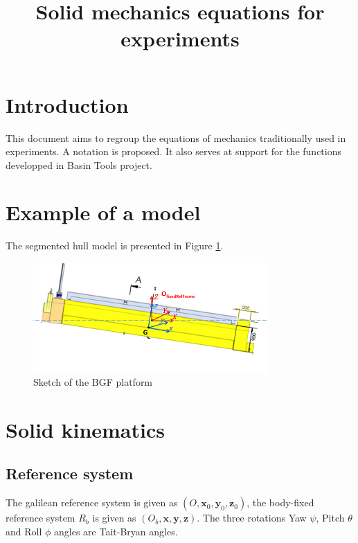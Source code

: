 \documentclass{article}
\title {Solid mechanics equations for experiments}
\begin{document}
\maketitle
\begin{versionhistory}
\end{versionhistory}

\section{Introduction}
This document aims to regroup the equations of mechanics traditionally used in experiments.  A notation is proposed. It also serves at support for the functions developped in Basin Tools project. 

\section{Example of a model}

The segmented hull model is presented in Figure \ref{figSegmentedHullModel}. 

\begin{figure}[htbp]
\centering
\includegraphics[width=0.8\textwidth]{BGF}
\caption{Sketch of the BGF platform}
\label{figSegmentedHullModel}
\end{figure}




\section{Solid kinematics}

\subsection{Reference system}

The galilean reference system is given as $(O,\mathbf{x}_0, \mathbf{y}_0, \mathbf{z}_0)$, the body-fixed reference system $R_b$ is given as  $(O_b,\mathbf{x}, \mathbf{y}, \mathbf{z})$. The three rotations Yaw $\psi$, Pitch $\theta$  and Roll $\phi$ angles are Tait-Bryan angles.
\end{document}
